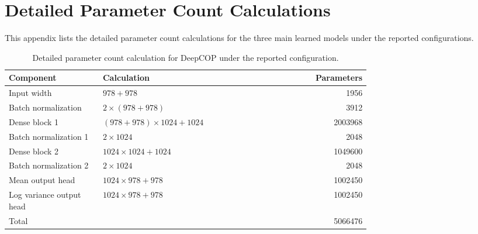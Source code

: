 \appendix
\chapter{Detailed Parameter Count Calculations}
\label{app:param_count_details}

\noindent This appendix lists the detailed parameter count calculations for the three main learned models under the reported configurations.

\begin{table}[htbp]
    \centering
    \caption[DeepCOP Parameter Calculation Details]{Detailed parameter count calculation for DeepCOP under the reported configuration.}
    \label{tab:deepcop_param_count_appendix}
    \begin{tabular}{p{0.26\linewidth}p{0.46\linewidth}r}
        \hline
        Component & Calculation & Parameters \\
        \hline
        Input width & $978 + 978$ & 1956 \\
        Batch normalization & $2 \times (978 + 978)$ & 3912 \\
        Dense block 1 & $(978 + 978) \times 1024 + 1024$ & 2003968 \\
        Batch normalization 1 & $2 \times 1024$ & 2048 \\
        Dense block 2 & $1024 \times 1024 + 1024$ & 1049600 \\
        Batch normalization 2 & $2 \times 1024$ & 2048 \\
        Mean output head & $1024 \times 978 + 978$ & 1002450 \\
        Log variance output head & $1024 \times 978 + 978$ & 1002450 \\
        \hline
        Total &  & 5066476 \\
        \hline
    \end{tabular}
\end{table}

